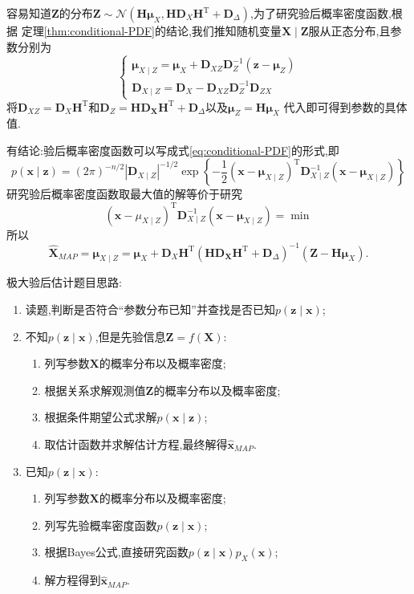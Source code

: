 \documentclass[cn,10pt,citestyle=gb7714-2015,bibstyle=gb7714-2015]{elegantbook}
\newcommand{\mT}{\mathrm{T}}
\begin{document}
\begin{solution}
  容易知道$\bm{Z}$的分布$\bm{Z}\sim\mathcal{N}(\bm{H}\bm{\mu}_{X},\bm{H}\bm{D}_{X}\bm{H}^\mT+\bm{D}_{\varDelta})$,为了研究验后概率密度函数,根据
  定理\ref{thm:conditional-PDF}的结论,我们推知随机变量$\bm{X}\mid\bm{Z}$服从正态分布,且参数分别为
  \[
  \begin{cases}
    \bm{\mu}_{X\mid Z}=\bm{\mu}_X+\bm{D}_{XZ}\bm{D}_{Z}^{-1}(\bm{z}-\bm{\mu}_Z)\\
    \bm{D}_{X\mid Z}=\bm{D}_{X}-\bm{D}_{XZ}\bm{D}_Z^{-1}\bm{D}_{ZX}
  \end{cases}
  \]
  将$\bm{D}_{XZ}=\bm{D}_X\bm{H}^\mT$和$\bm{D}_Z=\bm{H}\bm{D}_{\bm{X}}\bm{H}^\mT+\bm{D}_{\varDelta}$以及$\bm{\mu}_Z=\bm{H}\bm{\mu}_X$
  代入即可得到参数的具体值.

  有结论:验后概率密度函数可以写成式\eqref{eq:conditional-PDF}的形式,即
  \[
      p(\bm{x}\mid\bm{z})=(2\pi)^{-n/2}|\bm{D}_{X\mid Z}|^{-1/2}\exp\left\{-\frac12(\bm{x}-\bm{\mu}_{X\mid Z})^\mT\bm{D}_{X\mid Z}^{-1}(\bm{x}-\bm{\mu}_{X\mid Z})\right\}
  \]
  研究验后概率密度函数取最大值的解等价于研究
  \[
    (\bm{x}-\mu_{X\mid Z})^\mT\bm{D}_{X\mid Z}^{-1}(\bm{x}-\bm{\mu}_{X\mid Z})=\min
  \]
  所以
  \[
    \hat{\bm{X}}_{MAP}=\bm{\mu}_{X\mid Z}=\bm{\mu}_X+\bm{D}_X\bm{H}^\mT(\bm{H}\bm{D}_{\bm{X}}\bm{H}^\mT+\bm{D}_{\varDelta})^{-1}(\bm{Z}-\bm{H}\bm{\mu}_X).
  \]
\end{solution}
\begin{conclusion}极大验后估计题目思路:
  \begin{enumerate}
    \item 读题,判断是否符合“参数分布已知”并查找是否已知$p(\bm{z}\mid\bm{x})$;
    \item 不知$p(\bm{z}\mid\bm{x})$,但是先验信息$\bm{Z}=f(\bm{X})$:
    \begin{enumerate}
      \item 列写参数$\bm{X}$的概率分布以及概率密度;
      \item 根据关系求解观测值$\bm{Z}$的概率分布以及概率密度;
      \item 根据条件期望公式求解$p(\bm{x}\mid\bm{z})$;
      \item 取估计函数并求解估计方程,最终解得$\hat{\bm{x}}_{MAP}$.
    \end{enumerate}
    \item 已知$p(\bm{z}\mid\bm{x})$:
    \begin{enumerate}
      \item 列写参数$\bm{X}$的概率分布以及概率密度;
      \item 列写先验概率密度函数$p(\bm{z}\mid\bm{x})$;
      \item 根据Bayes公式,直接研究函数$p(\bm{z}\mid\bm{x})p_X(\bm{x})$;
      \item 解方程得到$\hat{\bm{x}}_{MAP}$.
    \end{enumerate}
  \end{enumerate}
\end{conclusion}
\end{document}
